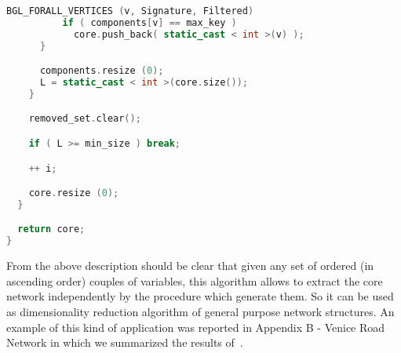 \documentclass{standalone}
\begin{document}
\begin{lstlisting}[language=C++, caption=DNetPRO signature extraction, label=code:featuresel]
        BGL_FORALL_VERTICES (v, Signature, Filtered)
          if ( components[v] == max_key )
            core.push_back( static_cast < int >(v) );
      }

      components.resize (0);
      L = static_cast < int >(core.size());
    }

    removed_set.clear();

    if ( L >= min_size ) break;

    ++ i;

    core.resize (0);
  }

  return core;
}

\end{lstlisting}

From the above description should be clear that given any set of ordered (in ascending order) couples of variables, this algorithm allows to extract the core network independently by the procedure which generate them.
So it can be used as dimensionality reduction algorithm of general purpose network structures.
An example of this kind of application was reported in Appendix B - Venice Road Network in which we summarized the results of~\cite{Mizzi2018, CurtiSDPS2018}.
\end{document}
